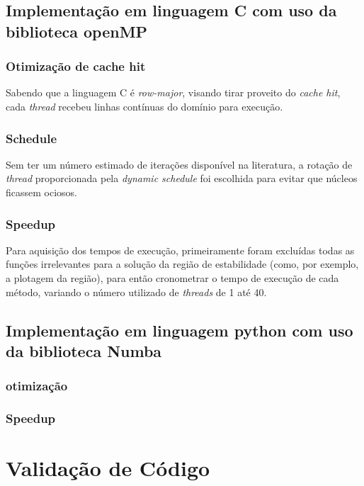 \documentclass[a4paper,12pt]{article}
\begin{document}
\subsection{Implementação em linguagem C com uso da biblioteca openMP}
\subsubsection{Otimização de cache hit}
Sabendo que a linguagem C é \textit{row-major}, visando tirar proveito do \textit{cache hit}, cada \textit{thread} recebeu linhas contínuas do domínio para execução.
\subsubsection{Schedule}
Sem ter um número estimado de iterações disponível na literatura, a rotação de \textit{thread} proporcionada pela \textit{dynamic schedule} foi escolhida para evitar que núcleos ficassem ociosos.
\subsubsection{Speedup}
Para aquisição dos tempos de execução, primeiramente foram excluídas todas as funções irrelevantes para a solução da região de estabilidade (como, por exemplo, a plotagem da região), para então cronometrar o tempo de execução de cada método, variando o número utilizado de \textit{threads} de 1 até 40.\\


\subsection{Implementação em linguagem python com uso da biblioteca Numba}

\subsubsection{otimização}

\subsubsection{Speedup}


\section{Validação de Código}


\end{document}
